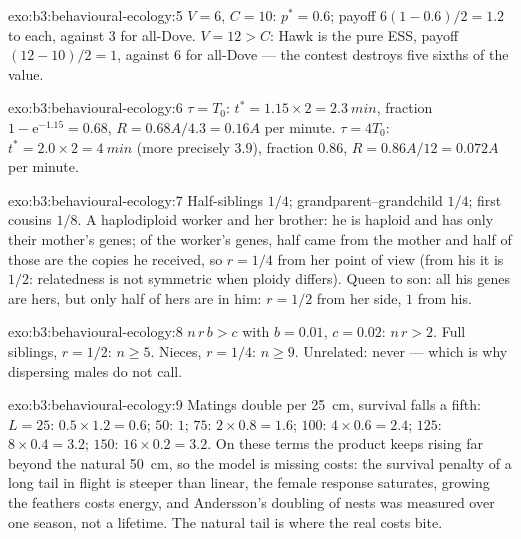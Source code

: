 \begin{solution}{exo:b3:behavioural-ecology:5}
$V = 6$, $C = 10$: $p^{*} = 0.6$; payoff $6(1 - 0.6)/2 = 1.2$ to each,
against $3$ for all-Dove. $V = 12 > C$: Hawk is the pure ESS, payoff
$(12 - 10)/2 = 1$, against $6$ for all-Dove --- the contest destroys
five sixths of the value.
\end{solution}

\begin{solution}{exo:b3:behavioural-ecology:6}
$\tau = T_{0}$: $t^{*} = 1.15\times 2 = \qty{2.3}{min}$, fraction $1 -
\mathrm{e}^{-1.15} = 0.68$, $R = 0.68A/4.3 = 0.16A$ per minute. $\tau =
4T_{0}$: $t^{*} = 2.0\times 2 = \qty{4}{min}$ (more precisely $3.9$),
fraction $0.86$, $R = 0.86A/12 = 0.072A$ per minute.
\end{solution}

\begin{solution}{exo:b3:behavioural-ecology:7}
Half-siblings $1/4$; grandparent--grandchild $1/4$; first cousins $1/8$.
A haplodiploid worker and her brother: he is haploid and has only
their mother's genes; of the worker's genes, half came from the mother
and half of those are the copies he received, so $r = 1/4$ from her
point of view (from his it is $1/2$: relatedness is not symmetric when
ploidy differs). Queen to son: all his genes are hers, but only half
of hers are in him: $r = 1/2$ from her side, $1$ from his.
\end{solution}

\begin{solution}{exo:b3:behavioural-ecology:8}
$n\,r\,b > c$ with $b = 0.01$, $c = 0.02$: $n\,r > 2$. Full siblings, $r
= 1/2$: $n \ge 5$. Nieces, $r = 1/4$: $n \ge 9$. Unrelated: never ---
which is why dispersing males do not call.
\end{solution}

\begin{solution}{exo:b3:behavioural-ecology:9}
Matings double per \qty{25}{cm}, survival falls a fifth: $L = 25$:
$0.5\times 1.2 = 0.6$; $50$: $1$; $75$: $2\times 0.8 = 1.6$; $100$:
$4\times 0.6 = 2.4$; $125$: $8\times 0.4 = 3.2$; $150$: $16\times 0.2 =
3.2$. On these terms the product keeps rising far beyond the natural
\qty{50}{cm}, so the model is missing costs: the survival penalty of a
long tail in flight is steeper than linear, the female response
saturates, growing the feathers costs energy, and Andersson's doubling
of nests was measured over one season, not a lifetime. The natural tail
is where the real costs bite.
\end{solution}

